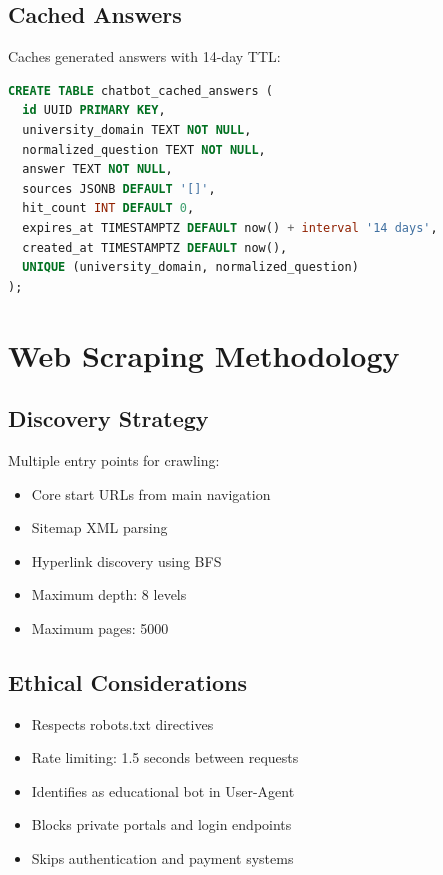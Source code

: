 \documentclass[12pt]{article}
\begin{document}
\subsection{Cached Answers}
Caches generated answers with 14-day TTL:
\begin{lstlisting}[language=SQL]
CREATE TABLE chatbot_cached_answers (
  id UUID PRIMARY KEY,
  university_domain TEXT NOT NULL,
  normalized_question TEXT NOT NULL,
  answer TEXT NOT NULL,
  sources JSONB DEFAULT '[]',
  hit_count INT DEFAULT 0,
  expires_at TIMESTAMPTZ DEFAULT now() + interval '14 days',
  created_at TIMESTAMPTZ DEFAULT now(),
  UNIQUE (university_domain, normalized_question)
);
\end{lstlisting}

\section{Web Scraping Methodology}

\subsection{Discovery Strategy}

Multiple entry points for crawling:
\begin{itemize}
    \item Core start URLs from main navigation
    \item Sitemap XML parsing
    \item Hyperlink discovery using BFS
    \item Maximum depth: 8 levels
    \item Maximum pages: 5000
\end{itemize}

\subsection{Ethical Considerations}

\begin{itemize}
    \item Respects robots.txt directives
    \item Rate limiting: 1.5 seconds between requests
    \item Identifies as educational bot in User-Agent
    \item Blocks private portals and login endpoints
    \item Skips authentication and payment systems
\end{itemize}
\end{document}
